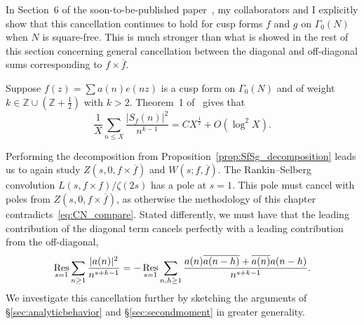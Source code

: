 \begin{remark}
  In Section~6 of the soon-to-be-published paper~\cite{hkldw}, my collaborators and I
  explicitly show that this cancellation continues to hold for cusp forms $f$ and $g$ on
  $\Gamma_0(N)$ when $N$ is square-free.
  This is much stronger than what is showed in the rest of this section concerning general
  cancellation between the diagonal and off-diagonal sums corresponding to $f \times
  \overline{f}$.
\end{remark}


Suppose $f(z) = \sum a(n)e(nz)$ is a cusp form on $\Gamma_0(N)$ and of weight $k \in
\mathbb{Z}\cup(\mathbb{Z} + \frac{1}{2})$ with $k > 2$.
Theorem~1 of~\cite{chandrasekharan1964mean} gives that
\begin{equation}\label{eq:CN_compare}
  \frac{1}{X} \sum_{n \leq X} \frac{\lvert S_f(n) \rvert^2}{n^{k-1}}  = C X^{\frac{1}{2}}
  + O(\log^2 X).
\end{equation}


Performing the decomposition from Proposition~\ref{prop:SfSg_decomposition} leads us to
again study $Z(s, 0, f\times \overline{f})$ and $W(s; f,\overline{f})$.
The Rankin--Selberg convolution %
$L(s, f\times f)/\zeta(2s)$ has a pole at $s = 1$.
This pole must cancel with poles from $Z(s, 0, f\times \overline{f})$, as otherwise the
methodology of this chapter contradicts~\eqref{eq:CN_compare}.
Stated differently, we must have that the leading contribution of the diagonal term
cancels perfectly with a leading contribution from the off-diagonal,
\begin{equation*}
  \operatorname*{Res}_{s = 1}\sum_{n \geq 1}\frac{\lvert a(n) \rvert^2}{n^{s + k - 1}} = - \operatorname*{Res}_{s =
  1}\sum_{n,h \geq 1} \frac{a(n) \overline{a(n-h)} + \overline{a(n)}a(n-h)}{n^{s + k -
  1}}.
\end{equation*}
We investigate this cancellation further by sketching the arguments of
\S\ref{sec:analyticbehavior} and \S\ref{sec:secondmoment} in greater generality.



